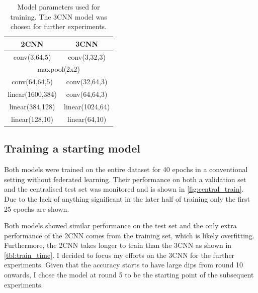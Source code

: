 \documentclass{article}
\begin{document}
\begin{table}
  \centering
  \begin{tabular}{cc}
    \hline
    2CNN             & 3CNN            \\
    \hline
    conv(3,64,5)     & conv(3,32,3)    \\
    \multicolumn{2}{c}{maxpool(2x2)}   \\
    conv(64,64,5)    & conv(32,64,3)   \\
    linear(1600,384) & conv(64,64,3)   \\
    linear(384,128)  & linear(1024,64) \\
    linear(128,10)   & linear(64,10)
  \end{tabular}
  \caption{Model parameters used for training. The 3CNN model was chosen for further experiments.}
  \label{tbl:model_params}
\end{table}

\subsection{Training a starting model}
Both models were trained on the entire dataset for 40 epochs in a conventional setting without federated learning. Their performance on both a validation set and the centralised test set was monitored and is shown in \cref{fig:central_train}. Due to the lack of anything significant in the later half of training only the first 25 epochs are shown.

Both models showed similar performance on the test set and the only extra performance of the 2CNN comes from the training set, which is likely overfitting. Furthermore, the 2CNN takes longer to train than the 3CNN as shown in \cref{tbl:train_time}. I decided to focus my efforts on the 3CNN for the further experiments. Given that the accuracy starts to have large dips from round 10 onwards, I chose the model at round 5 to be the starting point of the subsequent experiments.
\end{document}
